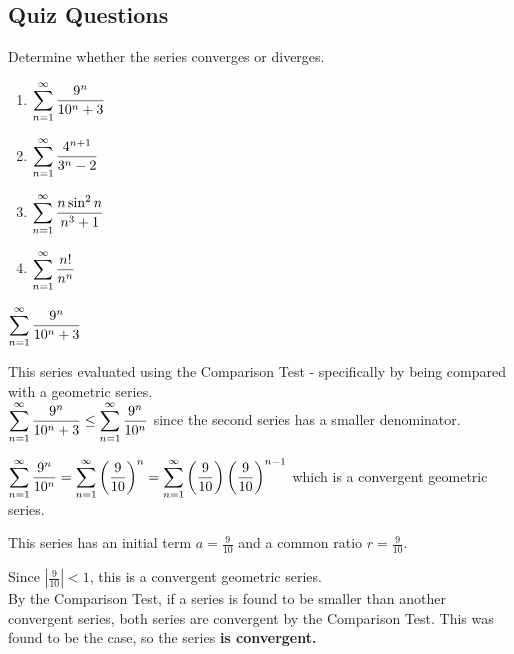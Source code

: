 \documentclass[12pt]{article}
\begin{document}
\subsection*{Quiz Questions}


Determine whether the series converges or diverges.
\begin{enumerate}[label=\alph*)]
\item $\mathlarger{\sum_{n=1}^{\infty} \frac{9^n}{10^n + 3}}$
\item $\mathlarger{\sum_{n=1}^{\infty} \frac{4^{n + 1}}{3^n - 2}}$
\item $\mathlarger{\sum_{n=1}^{\infty} \frac{n \sin^2 n}{n^3 + 1}}$
\item $\mathlarger{\sum_{n=1}^{\infty} \frac{n!}{n^n}}$
\end{enumerate}

\begin{solution}
$\mathlarger{\sum_{n=1}^{\infty} \frac{9^n}{10^n + 3}}$

This series evaluated using the Comparison Test - specifically by being compared with a geometric series.~\\

$\mathlarger{\sum_{n=1}^{\infty} \frac{9^n}{10^n + 3} \leq \sum_{n=1}^{\infty} \frac{9^n}{10^n}} $ since the second series has a smaller denominator.

$\mathlarger{\sum_{n=1}^{\infty} \frac{9^n}{10^n} = \sum_{n=1}^{\infty} \left(\frac{9}{10}\right)^{n} = \sum_{n=1}^{\infty} \left(\frac{9}{10}\right) \left(\frac{9}{10}\right)^{n -1}} $ which is a convergent geometric series.

This series has an initial term $a = \frac{9}{10}$ and a common ratio $r = \frac{9}{10}$. 

Since $\left| \frac{9}{10} \right| < 1$, this is a convergent geometric series.~\\

By the Comparison Test, if a series is found to be smaller than another convergent series, both series are convergent by the Comparison Test. This was found to be the case, so the series \textbf{is convergent.}

\end{solution}
\end{document}
